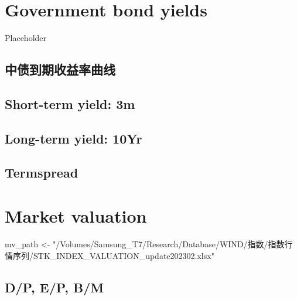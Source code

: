 \documentclass[
]{article}
\newenvironment{Shaded}{\begin{snugshade}}{\end{snugshade}}
\newcommand{\NormalTok}[1]{#1}
\newcommand{\OtherTok}[1]{\textcolor[rgb]{0.56,0.35,0.01}{#1}}
\newcommand{\StringTok}[1]{\textcolor[rgb]{0.31,0.60,0.02}{#1}}
\begin{document}
\hypertarget{government-bond-yields}{%
\section{Government bond yields}\label{government-bond-yields}}

Placeholder

\hypertarget{ux4e2dux503aux5230ux671fux6536ux76caux7387ux66f2ux7ebf}{%
\subsection{中债到期收益率曲线}\label{ux4e2dux503aux5230ux671fux6536ux76caux7387ux66f2ux7ebf}}

\hypertarget{short-term-yield-3m}{%
\subsection{Short-term yield: 3m}\label{short-term-yield-3m}}

\hypertarget{long-term-yield-10yr}{%
\subsection{Long-term yield: 10Yr}\label{long-term-yield-10yr}}

\hypertarget{termspread}{%
\subsection{Termspread}\label{termspread}}

\hypertarget{market-valuation}{%
\section{Market valuation}\label{market-valuation}}

\begin{Shaded}
\begin{Highlighting}[]
\NormalTok{mv\_path }\OtherTok{\textless{}{-}} \StringTok{"/Volumes/Samsung\_T7/Research/Database/WIND/指数/指数行情序列/STK\_INDEX\_VALUATION\_update202302.xlsx"}
\end{Highlighting}
\end{Shaded}

\hypertarget{dp-ep-bm}{%
\subsection{D/P, E/P, B/M}\label{dp-ep-bm}}
\end{document}
